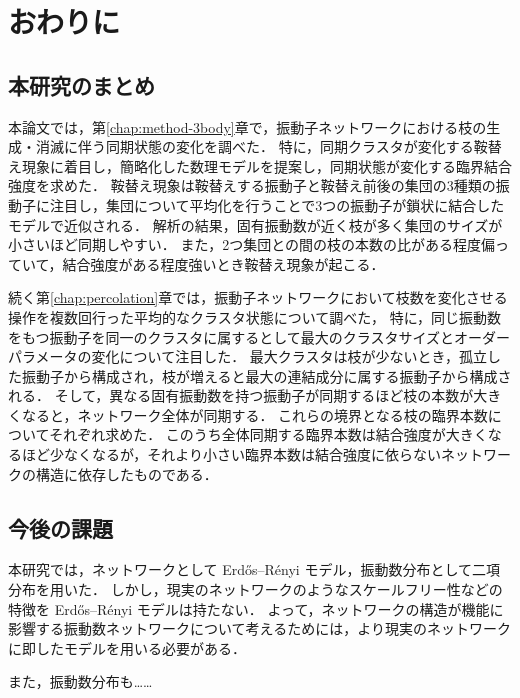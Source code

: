 \documentclass[../main]{subfiles}
\begin{document}
\chapter{おわりに}
\label{chap:summary}
\section{本研究のまとめ}
本論文では，第\ref{chap:method-3body}章で，振動子ネットワークにおける枝の生成・消滅に伴う同期状態の変化を調べた．
特に，同期クラスタが変化する鞍替え現象に着目し，簡略化した数理モデルを提案し，同期状態が変化する臨界結合強度を求めた．
鞍替え現象は鞍替えする振動子と鞍替え前後の集団の3種類の振動子に注目し，集団について平均化を行うことで3つの振動子が鎖状に結合したモデルで近似される．
解析の結果，固有振動数が近く枝が多く集団のサイズが小さいほど同期しやすい．
また，2つ集団との間の枝の本数の比がある程度偏っていて，結合強度がある程度強いとき鞍替え現象が起こる．

続く第\ref{chap:percolation}章では，振動子ネットワークにおいて枝数を変化させる操作を複数回行った平均的なクラスタ状態について調べた，
特に，同じ振動数をもつ振動子を同一のクラスタに属するとして最大のクラスタサイズとオーダーパラメータの変化について注目した．
最大クラスタは枝が少ないとき，孤立した振動子から構成され，枝が増えると最大の連結成分に属する振動子から構成される．
そして，異なる固有振動数を持つ振動子が同期するほど枝の本数が大きくなると，ネットワーク全体が同期する．
これらの境界となる枝の臨界本数についてそれぞれ求めた．
このうち全体同期する臨界本数は結合強度が大きくなるほど少なくなるが，それより小さい臨界本数は結合強度に依らないネットワークの構造に依存したものである．
\section{今後の課題}
本研究では，ネットワークとして Erdős–Rényi モデル，振動数分布として二項分布を用いた．
しかし，現実のネットワークのようなスケールフリー性などの特徴を Erdős–Rényi モデルは持たない．
よって，ネットワークの構造が機能に影響する振動数ネットワークについて考えるためには，より現実のネットワークに即したモデルを用いる必要がある．

また，振動数分布も……
\end{document}

